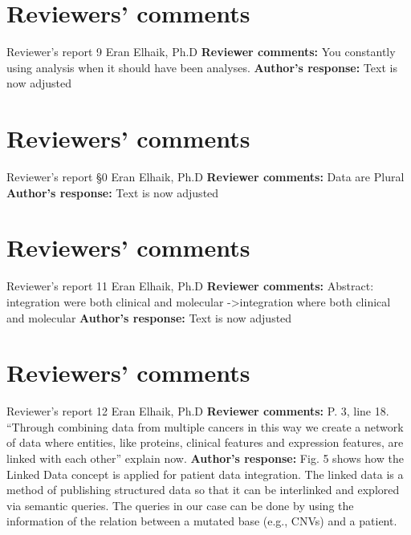 \documentclass{bmcart}
\begin{document}
\begin{backmatter}
\section*{Reviewers' comments}
\newline Reviewer's report 9
\newline Eran Elhaik, Ph.D
\newline \textbf{Reviewer comments:}
You constantly using analysis when it should have been analyses.
\newline \textbf{Author's response:}
Text is now adjusted

\section*{Reviewers' comments}
\newline Reviewer's report §0
\newline Eran Elhaik, Ph.D
\newline \textbf{Reviewer comments:}
Data are Plural
\newline \textbf{Author's response:}
Text is now adjusted

\section*{Reviewers' comments}
\newline Reviewer's report 11
\newline Eran Elhaik, Ph.D
\newline \textbf{Reviewer comments:}
Abstract: integration were both clinical and molecular ->integration where both clinical and molecular
\newline \textbf{Author's response:}
Text is now adjusted

\section*{Reviewers' comments}
\newline Reviewer's report 12
\newline Eran Elhaik, Ph.D
\newline \textbf{Reviewer comments:}
P. 3, line 18. “Through combining data from multiple cancers in this way we create a network of data where entities, like proteins, clinical features and expression features, are linked with each other” explain now.
\newline \textbf{Author's response:}
Fig. 5 shows how the Linked Data concept is applied for patient data integration. The linked data is a method of publishing structured data so that it can be interlinked and explored via semantic queries. The queries in our case can be done by using the information of the relation between a mutated base (e.g., CNVs) and a patient.


\end{backmatter}
\end{document}
